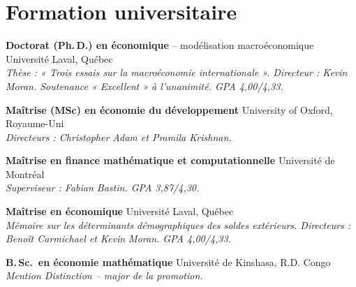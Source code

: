 \documentclass[11pt,letterpaper]{article}
\newenvironment{datelist}
  {\begin{description}[style=multiline,leftmargin=2.75cm,labelwidth=2.55cm,
     labelsep=0.2cm,font=\normalfont\small\color{soft},
     itemsep=0.45em,topsep=0.25em,parsep=0.15em]}
  {\end{description}}
\newcommand{\dotsep}{\;\textcolor{soft}{\textbullet}\;}
\newcommand{\meta}[1]{{\small\itshape\color{soft}#1}}
\begin{document}
\section{Formation universitaire}
\begin{datelist}
  \item[2018--2025] \textbf{Doctorat (Ph.\,D.) en économique} -- modélisation macroéconomique \dotsep Université Laval, Québec\\
    \meta{Thèse : « Trois essais sur la macroéconomie internationale ». Directeur : Kevin Moran. Soutenance « Excellent » à l'unanimité. GPA 4,00/4,33.}
  \item[2016--2017] \textbf{Maîtrise (MSc) en économie du développement} \dotsep University of Oxford, Royaume-Uni\\
    \meta{Directeurs : Christopher Adam et Pramila Krishnan.}
  \item[2022--présent] \textbf{Maîtrise en finance mathématique et computationnelle} \dotsep Université de Montréal\\
    \meta{Superviseur : Fabian Bastin. GPA 3,87/4,30.}
  \item[2012--2014] \textbf{Maîtrise en économique} \dotsep Université Laval, Québec\\
    \meta{Mémoire sur les déterminants démographiques des soldes extérieurs. Directeurs : Benoît Carmichael et Kevin Moran. GPA 4,00/4,33.}
  \item[2005--2010] \textbf{B.\,Sc.\ en économie mathématique} \dotsep Université de Kinshasa, R.D. Congo\\
    \meta{Mention Distinction -- major de la promotion.}
\end{datelist}
\end{document}
